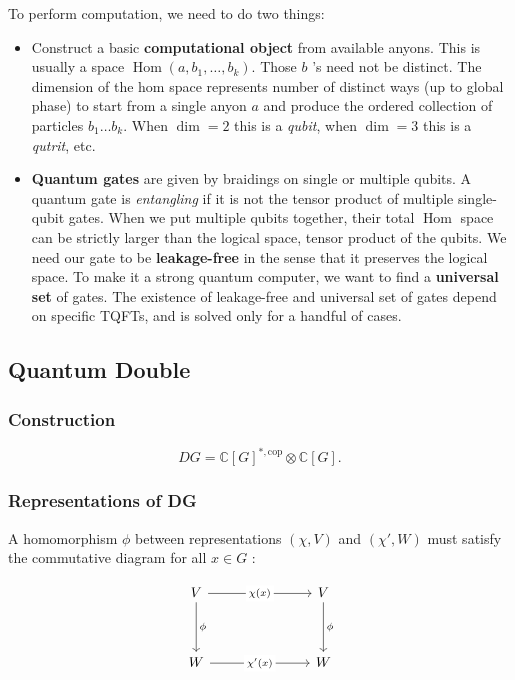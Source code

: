 To perform computation, we need to do two things:
\begin{itemize}
	\item Construct a basic \textbf{computational object} from available anyons. This is usually a space $\operatorname{Hom} (a, b_1, \ldots, b_k)$. Those $b$ 's need not be distinct. The dimension of the hom space represents number of distinct ways (up to global phase) to start from a single anyon $a$ and produce the ordered collection of particles $b_1 \ldots b_k$. When $\operatorname{dim}  = 2$ this is a \textit{qubit}, when $\operatorname{dim}  = 3$ this is a \textit{qutrit}, etc. 
	\item \textbf{Quantum gates} are given by braidings on single or multiple qubits. A quantum gate is \textit{entangling} if it is not the tensor product of multiple single-qubit gates. When we put multiple qubits together, their total $\operatorname{Hom} $ space can be strictly larger than the logical space, tensor product of the qubits. We need our gate to be \textbf{leakage-free} in the sense that it preserves the logical space. To make it a strong quantum computer, we want to find a \textbf{universal set} of gates. The existence of leakage-free and universal set of gates depend on specific TQFTs, and is solved only for a handful of cases.
\end{itemize}

\subsection{Quantum Double}

\subsubsection{Construction}

\[
	DG = \mathbb{C}[G]^{*, \text{cop}} \otimes \mathbb{C}[G]
.\] 


\subsubsection{Representations of DG}

A homomorphism $\phi$ between representations $(\chi, V)$ and $(\chi', W)$ must satisfy the commutative diagram for all $x \in G$ :

\[\begin{tikzcd}
	V &&& V \\
	\\
	W &&& W
	\arrow["\phi", from=1-1, to=3-1]
	\arrow["\phi", from=1-4, to=3-4]
	\arrow["{\chi(x)}"{description}, from=1-1, to=1-4]
	\arrow["{\chi'(x)}"{description}, from=3-1, to=3-4]
\end{tikzcd}\]

